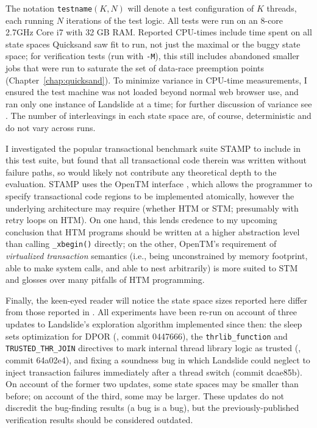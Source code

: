 The notation {\tt testname}$(K,N)$ will denote a test configuration of $K$ threads, each running $N$ iterations of the test logic.
All tests were run on an 8-core 2.7GHz Core i7 with 32 GB RAM.
Reported CPU-times include time spent on all state spaces
Quicksand saw fit to run,
not just the maximal or the buggy state space;
for verification tests (run with {\tt -M}),
this still includes abandoned smaller jobs that were run to saturate the set of data-race preemption points
(Chapter~\ref{chap:quicksand}).
To minimize variance in CPU-time measurements,
I ensured the test machine was not loaded beyond normal web browser use,
and ran only one instance of Landslide at a time;
for further discussion of variance see \cite{sigbovik-htm}.
The number of interleavings in each state space are, of course, deterministic and do not vary across runs.

I investigated the popular transactional benchmark suite STAMP \cite{stamp}
to include in this test suite,
but found that all transactional code therein was written without failure paths,
so would likely not contribute any theoretical depth to the evaluation.
STAMP uses the OpenTM interface \cite{opentm},
which allows the programmer to specify transactional code regions to be implemented atomically,
however the underlying architecture may require
(whether HTM or STM; presumably with retry loops on HTM).
On one hand,
this lends credence to my upcoming conclusion
that HTM programs should be written at a higher abstraction level than calling {\tt \_xbegin()} directly;
on the other,
OpenTM's requirement of {\em virtualized transaction} semantics
(i.e., being unconstrained by memory footprint, able to make system calls, and able to nest arbitrarily)
is more suited to STM and glosses over many pitfalls of HTM programming.

Finally, the keen-eyed reader will notice the state space sizes reported here
differ from those reported in \cite{sigbovik-htm}.
All experiments have been re-run
on account of three updates to Landslide's exploration algorithm
implemented since then:
the sleep sets optimization for DPOR (\sect{\ref{sec:landslide-sleepsets}}, commit 0447666),
the {\tt thrlib\_function} and {\tt TRUSTED\_THR\_JOIN} directives
to mark internal thread library logic as trusted (\sect{\ref{sec:landslide-config-landslide}}, commit 64a02e4),
and fixing a soundness bug in which Landslide could neglect to inject transaction failures
immediately after a thread switch (commit dcae85b).
On account of the former two updates, some state spaces may be smaller than before;
on account of the third, some may be larger.
These updates do not discredit the bug-finding results (a bug is a bug),
but the previously-published verification results should be considered outdated.

